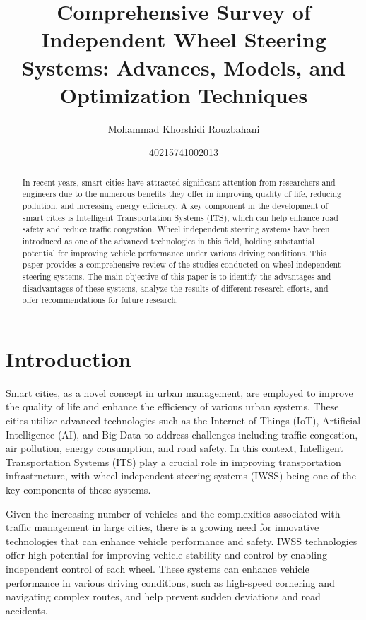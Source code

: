 \documentclass[a4paper,10pt]{article}
\title{Comprehensive Survey of Independent Wheel Steering Systems: Advances, Models, and Optimization Techniques}
\author{Mohammad Khorshidi Rouzbahani\and 40215741002013}
\date{}
\begin{document}
    \maketitle

    \begin{abstract}

        In recent years, smart cities have attracted significant attention from researchers and engineers due to the numerous benefits they offer in improving quality of life, reducing pollution, and increasing energy efficiency. A key component in the development of smart cities is Intelligent Transportation Systems (ITS), which can help enhance road safety and reduce traffic congestion. Wheel independent steering systems have been introduced as one of the advanced technologies in this field, holding substantial potential for improving vehicle performance under various driving conditions. This paper provides a comprehensive review of the studies conducted on wheel independent steering systems. The main objective of this paper is to identify the advantages and disadvantages of these systems, analyze the results of different research efforts, and offer recommendations for future research.

    \end{abstract}
    
    \section{Introduction}
   
        Smart cities, as a novel concept in urban management, are employed to improve the quality of life and enhance the efficiency of various urban systems. These cities utilize advanced technologies such as the Internet of Things (IoT), Artificial Intelligence (AI), and Big Data to address challenges including traffic congestion, air pollution, energy consumption, and road safety. In this context, Intelligent Transportation Systems (ITS) play a crucial role in improving transportation infrastructure, with wheel independent steering systems (IWSS) being one of the key components of these systems.

        Given the increasing number of vehicles and the complexities associated with traffic management in large cities, there is a growing need for innovative technologies that can enhance vehicle performance and safety. IWSS technologies offer high potential for improving vehicle stability and control by enabling independent control of each wheel. These systems can enhance vehicle performance in various driving conditions, such as high-speed cornering and navigating complex routes, and help prevent sudden deviations and road accidents.
\end{document}
